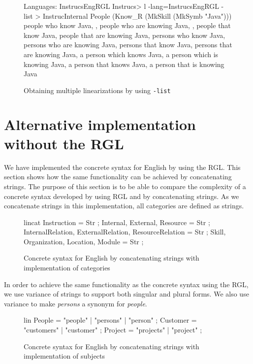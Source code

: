 \begin{figure}[H]
\begin{terminal}
Languages: InstrucsEngRGL
Instrucs> l -lang=InstrucsEngRGL -list 
>             InstrucInternal People (Know_R (MkSkill (MkSymb "Java")))
people who know Java, , people who are knowing Java, , people that know Java,
people that are knowing Java, persons who know Java, 
persons who are knowing Java, persons that know Java, 
persons that are knowing Java, a person which knows Java, 
a person which is knowing Java, a person that knows Java, 
a person that is knowing Java

\end{terminal}
\caption{Obtaining multiple linearizations by using \texttt{-list}\label{fig:multiple-linearizations}}
\end{figure}

\section{Alternative implementation without the RGL}\label{sec:english-concat}
We have implemented the concrete syntax for English by using the RGL. This section shows how the same functionality can be achieved by concatenating strings. The purpose of this section is to be able to compare the complexity of a concrete syntax developed by using RGL and by concatenating strings.\newline
\newline
As we concatenate strings in this implementation, all categories are defined as strings.

\begin{figure}[H]
\begin{code}
lincat
 Instruction = Str ;
 Internal, External, Resource = Str ;
 InternalRelation, ExternalRelation, ResourceRelation = Str ;
 Skill, Organization, Location, Module = Str ;
\end{code}
\caption{Concrete syntax for English by concatenating strings with implementation of categories\label{fig:concat-english-cat}}
\end{figure}

In order to achieve the same functionality as the concrete syntax using the RGL, we use variance of strings to support both singular and plural forms. We also use variance to make \emph{persons} a synonym for \emph{people}.

\begin{figure}[H]
\begin{code}
lin
 People = "people" | "persons" | "person" ;
 Customer = "customers" | "customer" ;
 Project = "projects" | "project" ;
\end{code}
\caption{Concrete syntax for English by concatenating strings with implementation of subjects\label{fig:concat-english-subjects}}
\end{figure}


